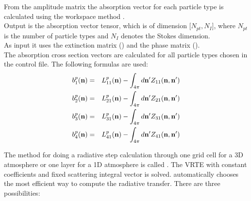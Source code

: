 From the amplitude matrix the absorption vector for each particle type
is calculated using the workspace method
.\\
Output is the absorption vector tensor, which is of dimension
[$N_{pt}, N_{I}$], where $N_{pt}$ is the number of particle
types  and $N_{I}$ denotes the Stokes dimension.\\
As input it uses the extinction matrix () and the
phase matrix
().\\
The absorption cross section vectors \SAbVec{} are calculated for all
particle types chosen in the control file. The following formulas are
used:
\begin{eqnarray}
  \label{eq:gen_abs_vector}
  b^p_1({\bf n}) &=&  L^p_{11}({\bf n}) - \int_{4\pi} d{\bf n'}
  Z_{11}({\bf n, n'})\\
  b^p_2({\bf n}) &=&  L^p_{21}({\bf n}) - \int_{4\pi} d{\bf n'}
  Z_{21}({\bf n, n'})\\
  b^p_3({\bf n}) &=&  L^p_{31}({\bf n}) - \int_{4\pi} d{\bf n'}
  Z_{31}({\bf n, n'})\\
  b^p_4({\bf n}) &=&  L^p_{41}({\bf n}) - \int_{4\pi} d{\bf n'}
  Z_{41}({\bf n, n'}) \\
\end{eqnarray}


\label{sec:scattering:rte_step}
The method for doing a radiative step calculation through one grid
cell for a 3D atmosphere or one layer for a 1D atmosphere is called
. The VRTE with constant coefficients and fixed
scattering integral vector is solved.  
automatically chooses the most efficient way to compute the radiative
transfer. There are three possibilities:

